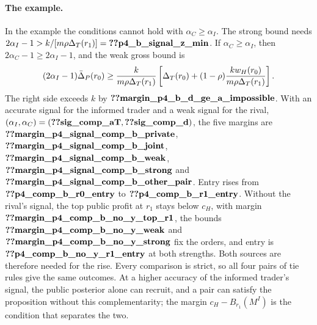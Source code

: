 \paragraph{The example.}
In the example the conditions cannot hold with \(\alpha_C\ge \alpha_I\). The strong bound needs \(2\alpha_I-1>k/[m\rho\DT(r_1)]=\reg{p4_b_signal_z_min}\). If \(\alpha_C\ge \alpha_I\), then \(2\alpha_C-1\ge2\alpha_I-1\), and the weak gross bound is
\[ (2\alpha_I-1)\bar\Delta_P(r_0)\ge\frac{k}{m\rho\Delta_T(r_1)}\left[\Delta_T(r_0)+(1-\rho)\frac{k w_H(r_0)}{m\rho\Delta_T(r_1)}\right].\]
The right side exceeds \(k\) by \(\reg{margin_p4_b_d_ge_a_impossible}\).
With an accurate signal for the informed trader and a weak signal for the rival, \((\alpha_I,\alpha_C)=(\reg{sig_comp_aT},\reg{sig_comp_d})\), the
five margins are \(\reg{margin_p4_signal_comp_b_private}\), \(\reg{margin_p4_signal_comp_b_joint}\),
\(\reg{margin_p4_signal_comp_b_weak}\), \(\reg{margin_p4_signal_comp_b_strong}\) and
\(\reg{margin_p4_signal_comp_b_other_pair}\). Entry rises from \(\reg{p4_comp_b_r0_entry}\) to
\(\reg{p4_comp_b_r1_entry}\). Without the rival's signal, the top public profit at \(r_1\) stays below \(c_H\),
with margin \(\reg{margin_p4_comp_b_no_y_top_r1}\), the bounds \(\reg{margin_p4_comp_b_no_y_weak}\) and
\(\reg{margin_p4_comp_b_no_y_strong}\) fix the orders, and entry is \(\reg{p4_comp_b_no_y_r1_entry}\) at both strengths.
Both sources are therefore needed for the rise. Every comparison is strict, so all four pairs of tie rules give the
same outcomes. At a higher accuracy of the informed trader's signal, the public posterior alone can recruit, and a pair can satisfy the
proposition without this complementarity; the margin \(c_H-B_{r_1}(M^I)\) is the condition that separates the two.

